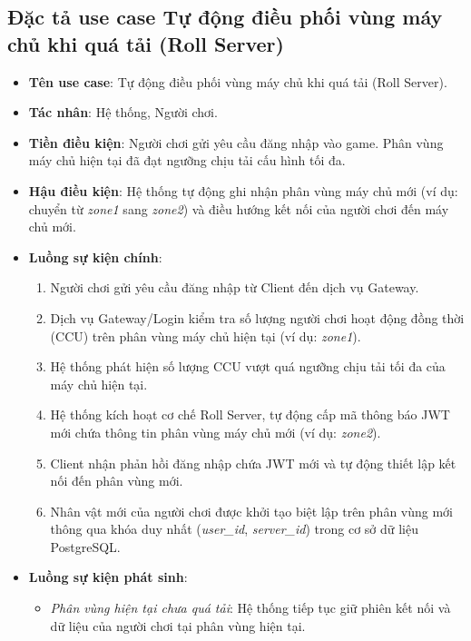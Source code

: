 \documentclass[../Project.tex]{subfiles}
\begin{document}
\subsection{Đặc tả use case Tự động điều phối vùng máy chủ khi quá tải (Roll Server)}
\begin{itemize}
    \item \textbf{Tên use case}: Tự động điều phối vùng máy chủ khi quá tải (Roll Server).
    \item \textbf{Tác nhân}: Hệ thống, Người chơi.
    \item \textbf{Tiền điều kiện}: Người chơi gửi yêu cầu đăng nhập vào game. Phân vùng máy chủ hiện tại đã đạt ngưỡng chịu tải cấu hình tối đa.
    \item \textbf{Hậu điều kiện}: Hệ thống tự động ghi nhận phân vùng máy chủ mới (ví dụ: chuyển từ \textit{zone1} sang \textit{zone2}) và điều hướng kết nối của người chơi đến máy chủ mới.
    \item \textbf{Luồng sự kiện chính}:
    \begin{enumerate}
        \item Người chơi gửi yêu cầu đăng nhập từ Client đến dịch vụ Gateway.
        \item Dịch vụ Gateway/Login kiểm tra số lượng người chơi hoạt động đồng thời (CCU) trên phân vùng máy chủ hiện tại (ví dụ: \textit{zone1}).
        \item Hệ thống phát hiện số lượng CCU vượt quá ngưỡng chịu tải tối đa của máy chủ hiện tại.
        \item Hệ thống kích hoạt cơ chế Roll Server, tự động cấp mã thông báo JWT mới chứa thông tin phân vùng máy chủ mới (ví dụ: \textit{zone2}).
        \item Client nhận phản hồi đăng nhập chứa JWT mới và tự động thiết lập kết nối đến phân vùng mới.
        \item Nhân vật mới của người chơi được khởi tạo biệt lập trên phân vùng mới thông qua khóa duy nhất (\textit{user\_id}, \textit{server\_id}) trong cơ sở dữ liệu PostgreSQL.
    \end{enumerate}
    \item \textbf{Luồng sự kiện phát sinh}:
    \begin{itemize}
        \item \textit{Phân vùng hiện tại chưa quá tải}: Hệ thống tiếp tục giữ phiên kết nối và dữ liệu của người chơi tại phân vùng hiện tại.
    \end{itemize}
\end{itemize}
\end{document}
